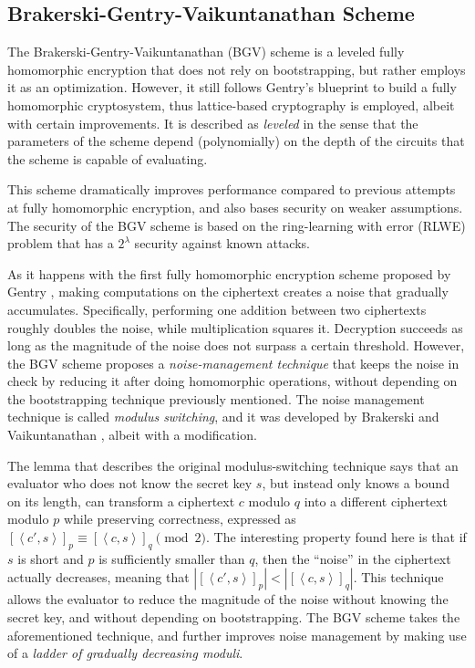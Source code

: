 \subsection{Brakerski-Gentry-Vaikuntanathan Scheme}

The Brakerski-Gentry-Vaikuntanathan (BGV) scheme \cite{cryptoeprint:2011:277} is a leveled fully homomorphic encryption that does not rely on bootstrapping, but rather employs it as an optimization. However, it still follows Gentry's blueprint to build a fully homomorphic cryptosystem, thus lattice-based cryptography is employed, albeit with certain improvements. It is described as \emph{leveled} in the sense that the parameters of the scheme depend (polynomially) on the depth of the circuits that the scheme is capable of evaluating.

This scheme dramatically improves performance compared to previous attempts at fully homomorphic encryption, and also bases security on weaker assumptions. The security of the BGV scheme is based on the ring-learning with error (RLWE) problem that has a $2^{\lambda}$ security against known attacks.

As it happens with the first fully homomorphic encryption scheme proposed by Gentry \cite{homoenc}, making computations on the ciphertext creates a noise that gradually accumulates. Specifically, performing one addition between two ciphertexts roughly doubles the noise, while multiplication squares it. Decryption succeeds as long as the magnitude of the noise does not surpass a certain threshold. However, the BGV scheme proposes a \emph{noise-management technique} that keeps the noise in check by reducing  it after doing homomorphic operations, without depending on the bootstrapping technique previously mentioned. The noise management technique is called \emph{modulus switching}, and it was developed by Brakerski and Vaikuntanathan \cite{cryptoeprint:2011:344}, albeit with a modification. 

The lemma that describes the original modulus-switching technique says that an evaluator who does not know the secret key $s$, but instead only knows a bound on its length, can transform a ciphertext $c$ modulo $q$ into a different ciphertext modulo $p$ while preserving correctness, expressed as $[\left \langle c',s \right \rangle]_{p} \equiv [\left \langle c,s  \right \rangle]_{q} \pmod{2}$. The interesting property found here is that if $s$ is short and $p$ is sufficiently smaller than $q$, then the ``noise'' in the ciphertext actually decreases, meaning that $|[\left \langle c',s \right \rangle]_{p}| < |[\left \langle c,s \right \rangle]_{q}|$. This technique allows the evaluator to reduce the magnitude of the noise without knowing the secret key, and without depending on bootstrapping. The BGV scheme takes the aforementioned technique, and further improves noise management by making use of a \emph{ladder of gradually decreasing moduli}.  

